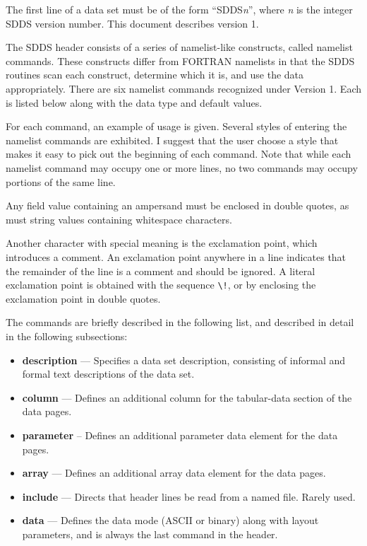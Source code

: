 \documentclass[11pt]{article}
\begin{document}
The first line of a data set must be of the form ``SDDS{\em n}'', where {\em n} is the integer SDDS version number.
This document describes version 1.

The SDDS header consists of a series of namelist-like constructs, called namelist commands.  These constructs
differ from FORTRAN namelists in that the SDDS routines scan each construct, determine which it is, and use the
data appropriately. There are six namelist commands recognized under Version 1.  Each is listed below along with
the data type and default values.

For each command, an example of usage is given.  Several styles of entering the namelist commands are exhibited.  I
suggest that the user choose a style that makes it easy to pick out the beginning of each command.  Note that while
each namelist command may occupy one or more lines, no two commands may occupy portions of the same line.

Any field value containing an ampersand must be enclosed in double quotes, as must string values containing
whitespace characters.

Another character with special meaning is the exclamation point, which introduces a comment.  An exclamation point
anywhere in a line indicates that the remainder of the line is a comment and should be ignored.  A literal
exclamation point is obtained with the sequence \verb|\!|, or by enclosing the exclamation point in double quotes.

The commands are briefly described in the following list, and described in detail in the following subsections:
\begin{itemize}
\item {\bf description} --- Specifies a data set description, consisting of informal and formal
        text descriptions of the data set.
\item {\bf column} --- Defines an additional column for the tabular-data section of the data pages.
\item {\bf parameter} -- Defines an additional parameter data element for the data pages.
\item {\bf array} --- Defines an additional array data element for the data pages.
\item {\bf include} --- Directs that header lines be read from a named file.  Rarely used.
\item {\bf data} --- Defines the data mode (ASCII or binary) along with layout parameters, and is
        always the last command in the header.
\end{itemize}
\end{document}
